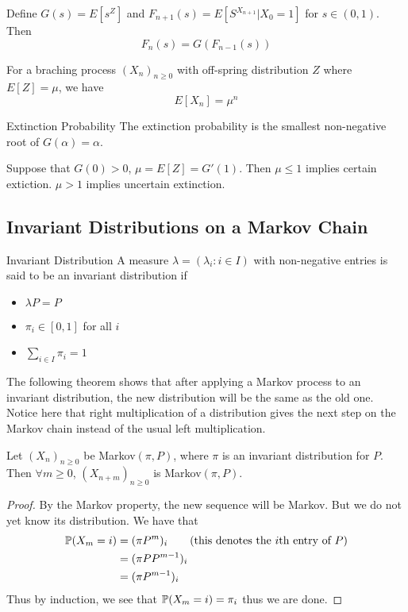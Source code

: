 \documentclass[a4paper]{article}
\begin{document}
\begin{prp}{}{} Define $G(s)=E[s^Z]$ and $F_{n+1}(s)=E[S^{X_{n+1}}|X_0=1]$ for $s\in(0,1)$. Then $$F_n(s)=G(F_{n-1}(s))$$
\end{prp}

\begin{prp}{}{} For a braching process $(X_n)_{n\geq 0}$ with off-spring distribution $Z$ where $E[Z]=\mu$, we have $$E[X_n]=\mu^n$$
\end{prp}

\begin{thm}{Extinction Probability}{} The extinction probability is the smallest non-negative root of $G(\alpha)=\alpha$. 
\end{thm}

\begin{thm}{}{} Suppose that $G(0)>0$, $\mu=E[Z]=G'(1)$. Then $\mu\leq 1$ implies certain extiction. $\mu>1$ implies uncertain extinction. 
\end{thm}

\subsection{Invariant Distributions on a Markov Chain}
\begin{defn}{Invariant Distribution}{} A measure $\lambda=(\lambda_i:i\in I)$ with non-negative entries is said to be an invariant distribution if 
\begin{itemize}
\item $\lambda P=P$
\item $\pi_i\in[0,1]$ for all $i$
\item $\sum_{i\in I}\pi_i=1$
\end{itemize}
\end{defn}

The following theorem shows that after applying a Markov process to an invariant distribution, the new distribution will be the same as the old one. Notice here that right multiplication of a distribution gives the next step on the Markov chain instead of the usual left multiplication. 

\begin{thm}{}{} Let $(X_n)_{n\geq 0}$ be Markov$(\pi,P)$, where $\pi$ is an invariant distribution for $P$. Then $\forall m\geq 0$, $(X_{n+m})_{n\geq 0}$ is Markov$(\pi,P)$. \tcbline
\begin{proof}
By the Markov property, the new sequence will be Markov. But we do not yet know its distribution. We have that 
\begin{align*}
\mathbb{P}(X_m=i)&=(\pi P^m)_i\tag{this denotes the $i$th entry of $P$}\\
&=(\pi PP^{m-1})_i\\
&=(\pi P^{m-1})_i
\end{align*}
Thus by induction, we see that $\mathbb{P}(X_m=i)=\pi_i$ thus we are done. 
\end{proof}
\end{thm}
\end{document}
